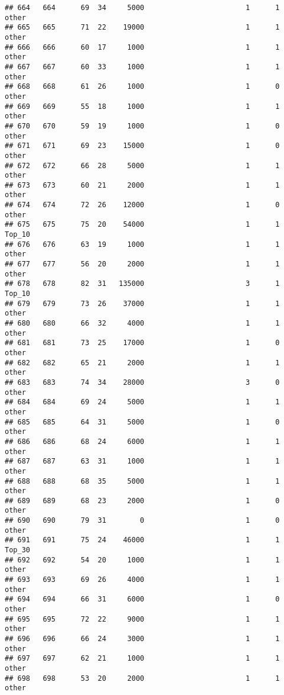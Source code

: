 \documentclass[
]{article}
\begin{document}
\begin{verbatim}
## 664   664      69  34     5000                        1      1    other
## 665   665      71  22    19000                        1      1    other
## 666   666      60  17     1000                        1      1    other
## 667   667      60  33     1000                        1      1    other
## 668   668      61  26     1000                        1      0    other
## 669   669      55  18     1000                        1      1    other
## 670   670      59  19     1000                        1      0    other
## 671   671      69  23    15000                        1      0    other
## 672   672      66  28     5000                        1      1    other
## 673   673      60  21     2000                        1      1    other
## 674   674      72  26    12000                        1      0    other
## 675   675      75  20    54000                        1      1   Top_10
## 676   676      63  19     1000                        1      1    other
## 677   677      56  20     2000                        1      1    other
## 678   678      82  31   135000                        3      1   Top_10
## 679   679      73  26    37000                        1      1    other
## 680   680      66  32     4000                        1      1    other
## 681   681      73  25    17000                        1      0    other
## 682   682      65  21     2000                        1      1    other
## 683   683      74  34    28000                        3      0    other
## 684   684      69  24     5000                        1      1    other
## 685   685      64  31     5000                        1      0    other
## 686   686      68  24     6000                        1      1    other
## 687   687      63  31     1000                        1      1    other
## 688   688      68  35     5000                        1      1    other
## 689   689      68  23     2000                        1      0    other
## 690   690      79  31        0                        1      0    other
## 691   691      75  24    46000                        1      1   Top_30
## 692   692      54  20     1000                        1      1    other
## 693   693      69  26     4000                        1      1    other
## 694   694      66  31     6000                        1      0    other
## 695   695      72  22     9000                        1      1    other
## 696   696      66  24     3000                        1      1    other
## 697   697      62  21     1000                        1      1    other
## 698   698      53  20     2000                        1      1    other

\end{verbatim}
\end{document}
